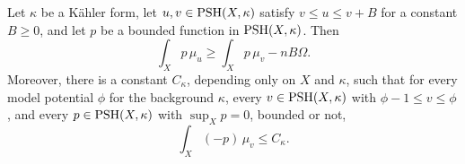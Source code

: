 \begin{lemma}\label{lem:global-singular-weighted-cln}
Let $\kappa$ be a K\"ahler form, let $u,v\in\mathrm{PSH}(X,\kappa)$ satisfy $v\leq u\leq v+B$ for a constant $B\geq0$, and let $p$ be a bounded function in $\mathrm{PSH}(X,\kappa)$. Then
\begin{equation}\label{eq:global-singular-weighted-cln}
 \int_Xp\,\mu_u\geq\int_Xp\,\mu_v-nB\Omega.
\end{equation}
Moreover, there is a constant $C_\kappa$, depending only on $X$ and $\kappa$, such that for every model potential $\phi$ for the background $\kappa$, every $v\in\mathrm{PSH}(X,\kappa)$ with $\phi-1\leq v\leq\phi$, and every $p\in\mathrm{PSH}(X,\kappa)$ with $\sup_Xp=0$, bounded or not,
\begin{equation}\label{eq:model-strip-uniform-weighted-cln}
 \int_X(-p)\,\mu_v\leq C_\kappa.
\end{equation}
\end{lemma}
